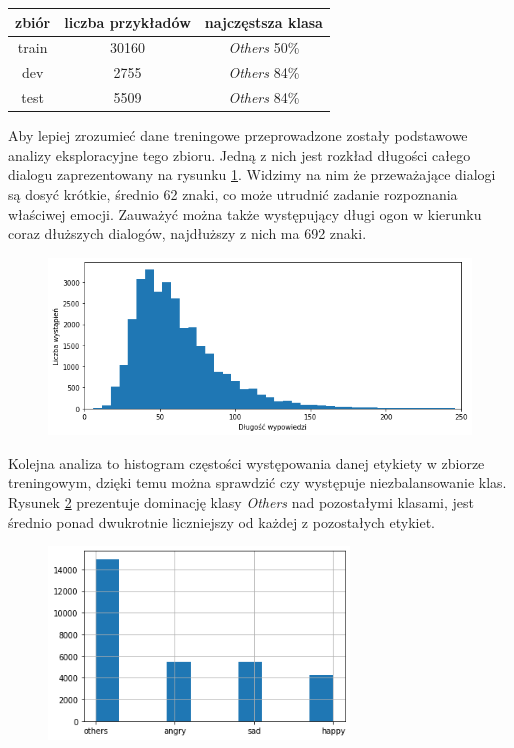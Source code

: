 \begin{table}[ht]
\label{tab:tabela_emocontext}
\centering\footnotesize%
\begin{tabular}{c c c}
\toprule
zbiór & liczba przykładów & najczęstsza klasa \\
\midrule
train   & 30160 & \textit{Others} 50\% \\
dev   & 2755 & \textit{Others} 84\% \\
test   & 5509 & \textit{Others} 84\% \\
\bottomrule
\end{tabular}
\end{table}

Aby lepiej zrozumieć dane treningowe przeprowadzone zostały podstawowe analizy eksploracyjne tego zbioru. Jedną z nich jest rozkład długości całego dialogu zaprezentowany na rysunku \ref{rys:rozklad_dl_semeval}. Widzimy na nim że przeważające dialogi są dosyć krótkie, średnio 62 znaki, co może utrudnić zadanie rozpoznania właściwej emocji. Zauważyć można także występujący długi ogon w kierunku coraz dłuższych dialogów, najdłuższy z nich ma 692 znaki.

\begin{figure}[t]
\centering\includegraphics[width=12cm]{figures/rozklad_dl_semeval.png}
\label{rys:rozklad_dl_semeval}
\end{figure}

Kolejna analiza to histogram częstości występowania danej etykiety w zbiorze treningowym, dzięki temu można sprawdzić czy występuje niezbalansowanie klas. Rysunek \ref{rys:rozklad_liczby_klas_semeval} prezentuje dominację klasy \textit{Others} nad pozostałymi klasami, jest średnio ponad dwukrotnie liczniejszy od każdej z pozostałych etykiet. 

\begin{figure}[t]
\centering\includegraphics[width=8cm]{figures/rozklad_liczby_klas_semeval.png}
\label{rys:rozklad_liczby_klas_semeval}
\end{figure}

